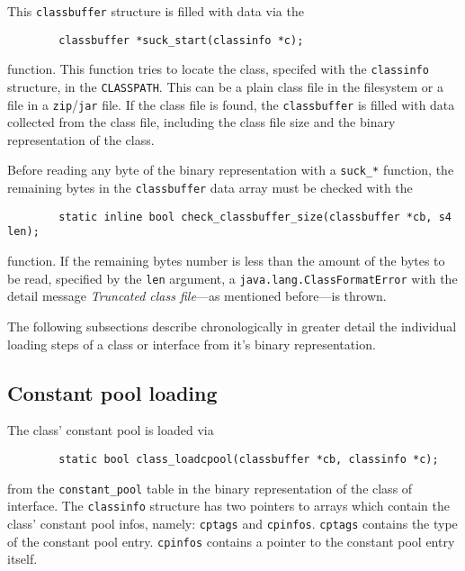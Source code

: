 This \texttt{classbuffer} structure is filled with data via the

\begin{verbatim}
        classbuffer *suck_start(classinfo *c);
\end{verbatim}

function. This function tries to locate the class, specifed with the
\texttt{classinfo} structure, in the \texttt{CLASSPATH}. This can be
a plain class file in the filesystem or a file in a
\texttt{zip}/\texttt{jar} file. If the class file is found, the
\texttt{classbuffer} is filled with data collected from the class
file, including the class file size and the binary representation of
the class.

Before reading any byte of the binary representation with a
\texttt{suck\_*} function, the remaining bytes in the
\texttt{classbuffer} data array must be checked with the

\begin{verbatim}
        static inline bool check_classbuffer_size(classbuffer *cb, s4 len);
\end{verbatim}

function. If the remaining bytes number is less than the amount of the
bytes to be read, specified by the \texttt{len} argument, a
\texttt{java.lang.ClassFormatError} with the detail message
\textit{Truncated class file}---as mentioned before---is thrown.

The following subsections describe chronologically in greater detail
the individual loading steps of a class or interface from it's binary
representation.


\subsection{Constant pool loading}
\label{sectionconstantpoolloading}

The class' constant pool is loaded via

\begin{verbatim}
        static bool class_loadcpool(classbuffer *cb, classinfo *c);
\end{verbatim}

from the \texttt{constant\_pool} table in the binary representation of
the class of interface. The \texttt{classinfo} structure has two
pointers to arrays which contain the class' constant pool infos,
namely: \texttt{cptags} and \texttt{cpinfos}. \texttt{cptags} contains
the type of the constant pool entry. \texttt{cpinfos} contains a
pointer to the constant pool entry itself.

